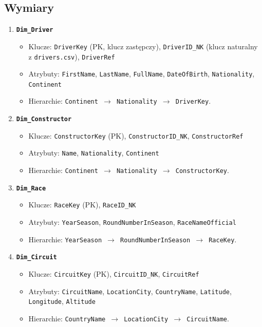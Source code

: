 \documentclass[a4paper,12pt]{article}
\begin{document}
\subsection{Wymiary}
\begin{enumerate}[label=\arabic*., wide, labelindent=0pt]
  \item \textbf{\texttt{Dim\_Driver}}
        \begin{itemize}[label=\textendash, leftmargin=1em]
          \item Klucze: \texttt{DriverKey} (PK, klucz zastępczy), \texttt{DriverID\_NK} (klucz naturalny z \texttt{drivers.csv}), \texttt{DriverRef}
          \item Atrybuty: \texttt{FirstName}, \texttt{LastName}, \texttt{FullName}, \texttt{DateOfBirth}, \texttt{Nationality}, \texttt{Continent}
          \item Hierarchie: \texttt{Continent \(\rightarrow\) Nationality \(\rightarrow\) DriverKey}.
        \end{itemize}

  \item \textbf{\texttt{Dim\_Constructor}}
        \begin{itemize}[label=\textendash, leftmargin=1em]
          \item Klucze: \texttt{ConstructorKey} (PK), \texttt{ConstructorID\_NK}, \texttt{ConstructorRef}
          \item Atrybuty: \texttt{Name}, \texttt{Nationality}, \texttt{Continent}
          \item Hierarchie: \texttt{Continent \(\rightarrow\) Nationality \(\rightarrow\) ConstructorKey}.
        \end{itemize}

  \item \textbf{\texttt{Dim\_Race}}
        \begin{itemize}[label=\textendash, leftmargin=1em]
          \item Klucze: \texttt{RaceKey} (PK), \texttt{RaceID\_NK}
          \item Atrybuty: \texttt{YearSeason}, \texttt{RoundNumberInSeason}, \texttt{RaceNameOfficial}
          \item Hierarchie: \texttt{YearSeason \(\rightarrow\) RoundNumberInSeason \(\rightarrow\) RaceKey}.
        \end{itemize}

  \item \textbf{\texttt{Dim\_Circuit}}
        \begin{itemize}[label=\textendash, leftmargin=1em]
          \item Klucze: \texttt{CircuitKey} (PK), \texttt{CircuitID\_NK}, \texttt{CircuitRef}
          \item Atrybuty: \texttt{CircuitName}, \texttt{LocationCity}, \texttt{CountryName}, \texttt{Latitude}, \texttt{Longitude}, \texttt{Altitude}
          \item Hierarchie: \texttt{CountryName \(\rightarrow\) LocationCity \(\rightarrow\) CircuitName}.
        \end{itemize}


\end{enumerate}
\end{document}
